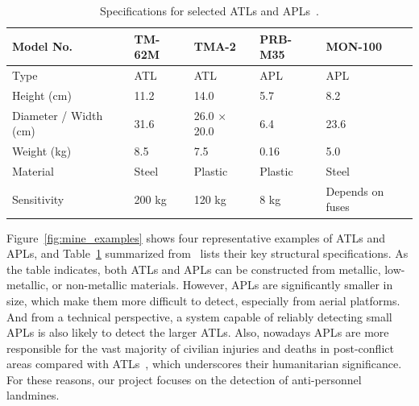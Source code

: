 \begin{table}[htbp]
    \centering
    \small
    \renewcommand{\arraystretch}{1.2}
    \begin{tabular}{@{} l p{2.8cm} p{2.8cm} p{2.8cm} p{2.8cm} @{}}
        \toprule
        \textbf{Model No.} & \textbf{TM-62M} & \textbf{TMA-2} & \textbf{PRB-M35} & \textbf{MON-100} \\
        \midrule
        Type & ATL & ATL & APL & APL \\
        Height (cm) & 11.2 & 14.0 & 5.7 & 8.2 \\
        Diameter / Width (cm) & 31.6 & 26.0 × 20.0 & 6.4 & 23.6 \\
        Weight (kg) & 8.5 & 7.5 & 0.16 & 5.0 \\
        Material & Steel & Plastic & Plastic & Steel \\
        Sensitivity & 200 kg & 120 kg & 8 kg & Depends on fuses \\
        \bottomrule
    \end{tabular}
    \caption[ATLs and APLs Specifications]{Specifications for selected ATLs and APLs~\cite{paik2002image}.}
    \label{tab:mine_specs}
\end{table}



Figure~\ref{fig:mine_examples} shows four representative examples of \gls{ATL}s and \gls{APL}s, and Table~\ref{tab:mine_specs} summarized from~\cite{paik2002image} lists their key structural specifications. As the table indicates, both \gls{ATL}s and \gls{APL}s can be constructed from metallic, low-metallic, or non-metallic materials. However, \gls{APL}s are significantly smaller in size, which make them more difficult to detect, especially from aerial platforms. And from a technical perspective, a system capable of reliably detecting small \gls{APL}s is also likely to detect the larger \gls{ATL}s. Also, nowadays \gls{APL}s are more responsible for the vast majority of civilian injuries and deaths in post-conflict areas compared with \gls{ATL}s~\cite{unmas2021handbook}, which underscores their humanitarian significance. For these reasons, our project focuses on the detection of anti-personnel landmines.
